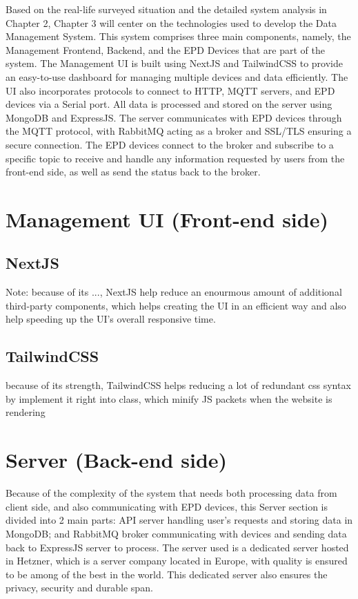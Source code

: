 \documentclass[../Main.tex]{subfiles}
\begin{document}
Based on the real-life surveyed situation and the detailed system analysis in Chapter 2, Chapter 3 will center on the technologies used to develop the Data Management System. This system comprises three main components, namely, the Management Frontend, Backend, and the EPD Devices that are part of the system. The Management UI is built using NextJS and TailwindCSS to provide an easy-to-use dashboard for managing multiple devices and data efficiently. The UI also incorporates protocols to connect to HTTP, MQTT servers, and EPD devices via a Serial port. All data is processed and stored on the server using MongoDB and ExpressJS. The server communicates with EPD devices through the MQTT protocol, with RabbitMQ acting as a broker and SSL/TLS ensuring a secure connection. The EPD devices connect to the broker and subscribe to a specific topic to receive and handle any information requested by users from the front-end side, as well as send the status back to the broker.

\section{Management UI (Front-end side)}
\subsection{NextJS}

Note: because of its ..., NextJS help reduce an enourmous amount of additional third-party components, which helps creating the UI in an efficient way and also help speeding up the UI's overall responsive time.
\subsection{TailwindCSS}

because of its strength, TailwindCSS helps reducing a lot of redundant css syntax by implement it right into class, which minify JS packets when the website is rendering

\section{Server (Back-end side)}
Because of the complexity of the system that needs both processing data from client side, and also communicating with EPD devices, this Server section is divided into 2 main parts: API server handling user's requests and storing data in MongoDB; and RabbitMQ broker communicating with devices and sending data back to ExpressJS server to process. The server used is a dedicated server hosted in Hetzner, which is a server company located in Europe, with quality is ensured to be among of the best in the world. This dedicated server also ensures the privacy, security and durable span.
\end{document}

